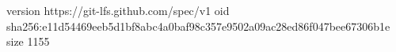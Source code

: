 version https://git-lfs.github.com/spec/v1
oid sha256:e11d54469eeb5d1bf8abc4a0baf98c357e9502a09ac28ed86f047bee67306b1e
size 1155
